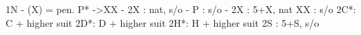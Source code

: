 1N - (X) = pen.
P* ->XX - 2X : nat, s/o
        - P  : s/o
   - 2X : 5+X, nat
XX : s/o
2C*: C + higher suit
2D*: D + higher suit
2H*: H + higher suit
2S : 5+S, s/o
